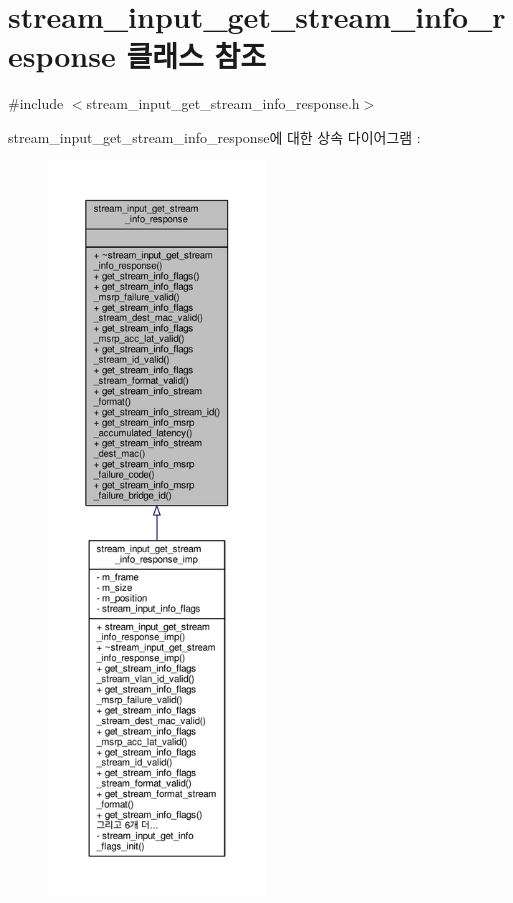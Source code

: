 \hypertarget{classavdecc__lib_1_1stream__input__get__stream__info__response}{}\section{stream\+\_\+input\+\_\+get\+\_\+stream\+\_\+info\+\_\+response 클래스 참조}
\label{classavdecc__lib_1_1stream__input__get__stream__info__response}


{\ttfamily \#include $<$stream\+\_\+input\+\_\+get\+\_\+stream\+\_\+info\+\_\+response.\+h$>$}



stream\+\_\+input\+\_\+get\+\_\+stream\+\_\+info\+\_\+response에 대한 상속 다이어그램 \+: 
\nopagebreak
\begin{figure}[H]
\begin{center}
\leavevmode
\includegraphics[height=550pt]{classavdecc__lib_1_1stream__input__get__stream__info__response__inherit__graph}
\end{center}
\end{figure}


